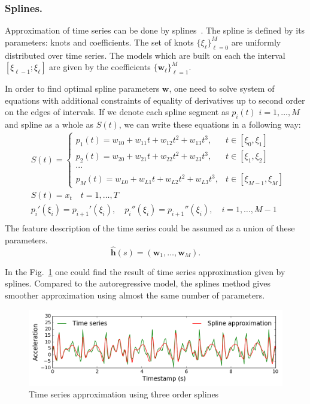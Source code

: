 \documentclass{llncs}
\begin{document}
\subsubsection{Splines.}
Approximation of time series can be done by splines~\cite{deboor1978splines}. The spline is defined by its parameters: knots and coefficients.
The set of knots $\{\xi_\ell\}_{\ell=0}^M$ are uniformly distributed over time series.
The models which are built on each the interval $[\xi_{\ell-1}; \xi_{\ell}]$ are given by the coefficients $\{\mathbf{w}_\ell\}_{\ell=1}^{M}$.

In order to find optimal spline parameters $\mathbf{w}$, one need to solve system of equations with additional constraints of equality of derivatives up to second order on the edges of intervals. If we denote each spline segment as $p_i(t)$ $i = 1, \dots, M$ and spline as a whole as $S(t)$, we can write these equations in a following way:
\begin{align*}
&S(t) = \begin{cases}
p_1(t) = w_{10} +w_{11}t + w_{12}t^2 + w_{13}t^3, & t\in [\xi_0, \xi_1]\\
p_2(t) = w_{20} +w_{21}t + w_{22}t^2 + w_{23}t^3, & t\in [\xi_1, \xi_2]\\
\cdots &\\
p_{M}(t) = w_{L0} +w_{L1}t + w_{L2}t^2 + w_{L3}t^3, & t\in [\xi_{M-1}, \xi_M]					
\end{cases}\\
&S(t) = x_t \quad t = 1, \dots, T\\
&p_i'(\xi_i) = p_{i+1}'(\xi_i), \quad p_i''(\xi_i) = p_{i+1}''(\xi_i), \quad i = 1, \dots, M-1\\
\end{align*}
The feature description of the time series could be assumed as a union of these parameters.
\[
\hat{\bm{h}}(s) = (\mathbf{w}_1, \dots, \mathbf{w}_{M}).
\]

In the Fig.~\ref{fig::spline_example} one could find the result of time series approximation given by splines. 
Compared to the autoregressive model, the splines method gives smoother approximation using almost the same number of parameters.

\begin{figure}[h]
	\centering
	\includegraphics[width=1\linewidth]{pics/spline_example.png}
	\caption{Time series approximation using three order splines}
	\label{fig::spline_example}
\end{figure}
\end{document}
